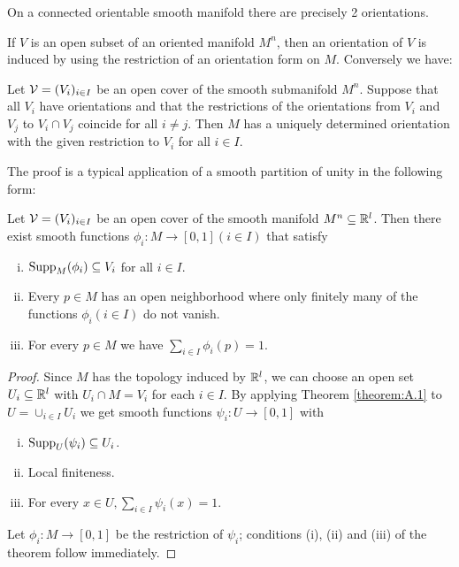 \begin{lemma}\label{lemma:9-9}
  On a connected orientable smooth manifold there are precisely 2 orientations.
\end{lemma}

If $V$ is an open subset of an oriented manifold $M^n$, then an orientation of $V$ is
induced by using the restriction of an orientation form on $M$. Conversely we have:

\begin{lemma}\label{lemma:9-10}
  Let $\mathcal{V} = (V_i)_{i\in I}$ be an open cover of the smooth submanifold $M^n$.
Suppose that all $V_i$ have orientations and that the restrictions of the orientations
from $V_i$ and $V_j$ to $V_i\cap V_j$ coincide for all $i\neq j$. Then $M$ has a uniquely 
determined orientation with the given restriction to $V_i$ for all $i\in I$.
\end{lemma}

The proof is a typical application of a smooth partition of unity in the following form:


\begin{theorem}\label{theorem:9-11}
  Let $\mathcal{V} = (V_i)_{i\in I}$ be an open cover of the smooth manifold $M^n\subseteq {\ensuremath{\mathbb{R}}}^l$. Then 
  there exist smooth functions $\phi_i:M\to [0, 1] (i\in I)$ that satisfy
  \begin{enumerate}[(i)]
    \item $\mathrm{Supp}_M(\phi_i)\subseteq V_i$ for all $i\in I$.
    \item Every $p\in M$ has an open neighborhood where only finitely many of the
      functions $\phi_i(i\in I)$ do not vanish.
    \item For every $p\in M$ we have $\sum_{i\in I}^{}{\phi_i(p)} = 1$.
  \end{enumerate}
\end{theorem}

\begin{proof}
  Since $M$ has the topology induced by ${\mathbb{R}}^l$, we can choose an open set
$U_i\subseteq {\ensuremath{\mathbb{R}}}^l$ with $U_i\cap M = V_i$ for each $i\in I$. By applying Theorem \ref{theorem:A.1} 
to $U= \cup_{i\in I} U_i$ we get smooth functions $\psi_i:U\to [0, 1]$ with
\begin{enumerate}[(i)]
  \item $\mathrm{Supp}_U(\psi_i)\subseteq U_i$.
  \item Local finiteness.
  \item For every $x\in U, \sum_{i\in I}\psi_i(x) = 1$.
\end{enumerate}
Let $\phi_i:M\to [0, 1]$ be the restriction of $\psi_i$; conditions (i), (ii) and (iii) of the
theorem follow immediately.
\end{proof}

